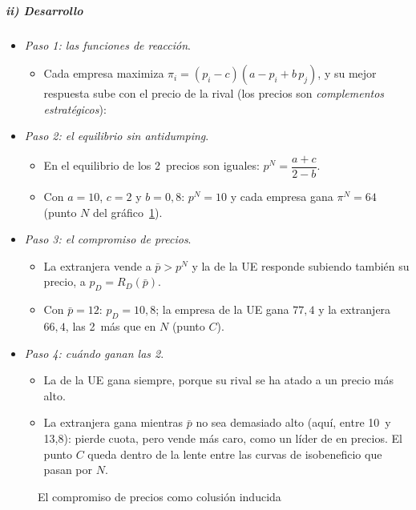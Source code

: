 \documentclass[11pt]{article}
\begin{document}
\subparagraph{ii) Desarrollo}

\begin{itemize}
\item \emph{Paso 1: las funciones de reacción}.
  \begin{itemize}
  \item Cada empresa maximiza $\pi_i=(p_i-c)(a-p_i+b\,p_j)$, y su mejor respuesta sube con el precio de la rival (los precios son \emph{complementos estratégicos}):
  \end{itemize}
\item \emph{Paso 2: el equilibrio sin antidumping}.
  \begin{itemize}
  \item En el equilibrio de  los 2~precios son iguales: $p^N=\dfrac{a+c}{2-b}$.
  \item Con $a=10$, $c=2$ y $b=0{,}8$: $p^N=10$ y cada empresa gana $\pi^N=64$ (punto $N$ del gráfico~\ref{fig:prusa}).
  \end{itemize}
\item \emph{Paso 3: el compromiso de precios}.
  \begin{itemize}
  \item La extranjera vende a $\bar p>p^N$ y la de la UE responde subiendo también su precio, a $p_D=R_D(\bar p)$.
  \item Con $\bar p=12$: $p_D=10{,}8$; la empresa de la UE gana $77{,}4$ y la extranjera $66{,}4$, las 2~más que en $N$ (punto $C$).
  \end{itemize}
\item \emph{Paso 4: cuándo ganan las 2}.
  \begin{itemize}
  \item La de la UE gana siempre, porque su rival se ha atado a un precio más alto.
  \item La extranjera gana mientras $\bar p$ no sea demasiado alto (aquí, entre 10~y 13,8): pierde cuota, pero vende más caro, como un líder de  en precios. El punto $C$ queda dentro de la lente entre las curvas de isobeneficio que pasan por $N$.
  \end{itemize}
\end{itemize}

\begin{figure}[H]
\centering
\caption{El compromiso de precios como colusión inducida}\label{fig:prusa}
\end{figure}
\end{document}
